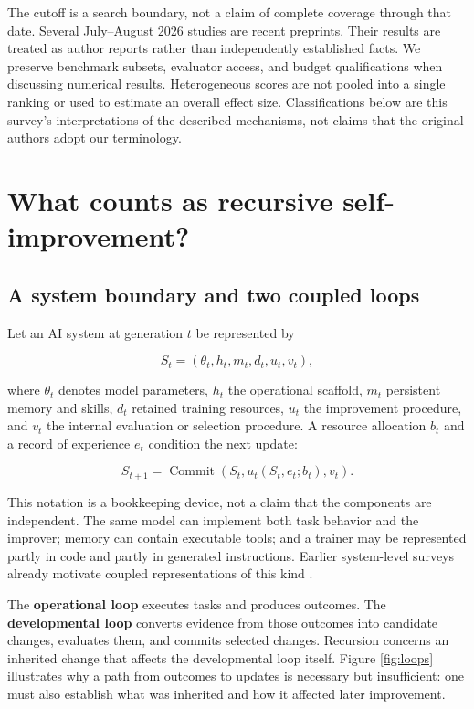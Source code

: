 \documentclass[11pt,american,]{article}
\begin{document}
The cutoff is a search boundary, not a claim of complete coverage
through that date. Several July--August 2026 studies are recent
preprints. Their results are treated as author reports rather than
independently established facts. We preserve benchmark subsets,
evaluator access, and budget qualifications when discussing numerical
results. Heterogeneous scores are not pooled into a single ranking or
used to estimate an overall effect size. Classifications below are this
survey's interpretations of the described mechanisms, not claims that
the original authors adopt our terminology.

\hypertarget{what-counts-as-recursive-self-improvement}{%
\section{What counts as recursive
self-improvement?}\label{what-counts-as-recursive-self-improvement}}

\hypertarget{a-system-boundary-and-two-coupled-loops}{%
\subsection{A system boundary and two coupled
loops}\label{a-system-boundary-and-two-coupled-loops}}

Let an AI system at generation \(t\) be represented by

\[
S_t=(\theta_t,h_t,m_t,d_t,u_t,v_t),
\]

where \(\theta_t\) denotes model parameters, \(h_t\) the operational
scaffold, \(m_t\) persistent memory and skills, \(d_t\) retained
training resources, \(u_t\) the improvement procedure, and \(v_t\) the
internal evaluation or selection procedure. A resource allocation
\(b_t\) and a record of experience \(e_t\) condition the next update:

\[
S_{t+1}=\operatorname{Commit}\!\left(S_t,u_t(S_t,e_t;b_t),v_t\right).
\]

This notation is a bookkeeping device, not a claim that the components
are independent. The same model can implement both task behavior and the
improver; memory can contain executable tools; and a trainer may be
represented partly in code and partly in generated instructions. Earlier
system-level surveys already motivate coupled representations of this
kind \citep{surveyren2026, surveyliu2026}.

The \textbf{operational loop} executes tasks and produces outcomes. The
\textbf{developmental loop} converts evidence from those outcomes into
candidate changes, evaluates them, and commits selected changes.
Recursion concerns an inherited change that affects the developmental
loop itself. Figure \ref{fig:loops} illustrates why a path from outcomes
to updates is necessary but insufficient: one must also establish what
was inherited and how it affected later improvement.
\end{document}
